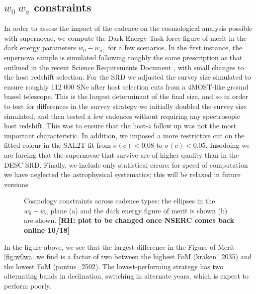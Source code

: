 \subsection{$w_0~w_a$ constraints}


In order to assess the impact of the cadence on the cosmological analysis possible with supernovae, we compute the Dark Energy Task force figure of merit in the dark energy parameters $w_0-w_a,$ for a few scenarios.
In the first instance, the supernova sample is simulated following roughly the same prescription as that outlined in the recent Science Requirements Document \cite{descsrd}, with small changes to the host redshift selection. For the SRD we adjusted the survey size simulated to ensure roughly 112 000 SNe after host selection cuts from a 4MOST-like ground based telescope. This is the largest determinant of the final size, and so in order to test for differences in the survey strategy we initially doubled the survey size simulated, and then tested a few cadences without requiring any spectrosopic host redshift. This was to ensure that the host-$z$ follow up was not the most important characteristic.
In addition, we imposed a more restrictive cut on the fitted colour in the SAL2T fit from $\sigma(c) < 0.08$ to $\sigma(c) < 0.05.$ Insodoing we are forcing that the supernovae that survive are of higher quality than in the DESC SRD.
Finally, we include only statistical errors: for speed of computation we have neglected the astrophysical systematics; this will be relaxed in future versions


\begin{figure}
  \begin{center}
    \caption{Cosmology constraints across cadence types: the ellipses in the $w_0-w_a$ plane (a) and the dark energy figure of merit is shown (b) are shown. \textbf{[RH: plot to be changed once NSERC comes back online 10/18]}}
    \end{center}
\end{figure}

In the figure above, we see that the largest difference in the Figure of Merit \ref{fig:w0wa} we find is a factor of two between the highest FoM (kraken\_2035) and the lowest FoM (pontus\_2502). The lowest-performing strategy has two alternating bands in declination, switching in alternate years, which is expect to perform poorly. 

